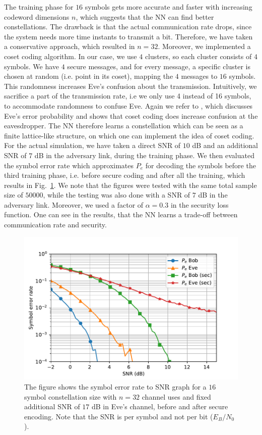 \documentclass[conference]{IEEEtran}
\begin{document}
The training phase for $16$ symbols gets more accurate and faster with increasing codeword dimensions $n$, which suggests that the NN can find better constellations. The drawback is that the actual communication rate drops, since the system needs more time instants to transmit a bit. Therefore, we have taken a conservative approach, which resulted in $n=32$. Moreover, we implemented a coset coding algorithm. In our case, we use $4$ clusters, so each cluster consists of $4$ symbols. We have $4$ secure messages, and for every message, a specific cluster is chosen at random (i.e. point in its coset), mapping the $4$ messages to $16$ symbols. This randomness increases Eve's confusion about the transmission. Intuitively, we sacrifice a part of the transmission rate, i.e we only use 4 instead of 16 symbols, to accommodate randomness to confuse Eve. Again we refer to \cite[Appendix A]{Oggier16}, which discusses Eve's error probability and shows that coset coding does increase confusion at the eavesdropper. The NN therefore learns a constellation which can be seen as a finite lattice-like structure, on which one can implement the idea of coset coding. For the actual simulation, we have taken a direct SNR of $10$ dB and an additional SNR of $7$ dB in the adversary link, during the training phase. We then evaluated the symbol error rate which approximates $P_e$ for decoding the symbols before the third training phase, i.e. before secure coding and after all the training, which results in Fig.~\ref{Rate_Sec}. We note that the figures were tested with the same total sample size of $50000$, while the testing was also done with a SNR of $7$ dB in the adversary link. Moreover, we used a factor of $\alpha=0.3$ in the security loss function. 
One can see in the results, that the NN learns a trade-off between communication rate and security.





\begin{figure}
\centering
\includegraphics[scale=0.65]{Pe-SNR_2.pdf}
\caption{The figure shows the symbol error rate to SNR graph for a $16$ symbol constellation size with $n=32$ channel uses and fixed additional SNR of $17$ dB in Eve's channel, before and after secure encoding. Note that the SNR is per symbol and not per bit ($E_B/N_0$).}
\label{Rate_Sec}
\end{figure}
\end{document}
